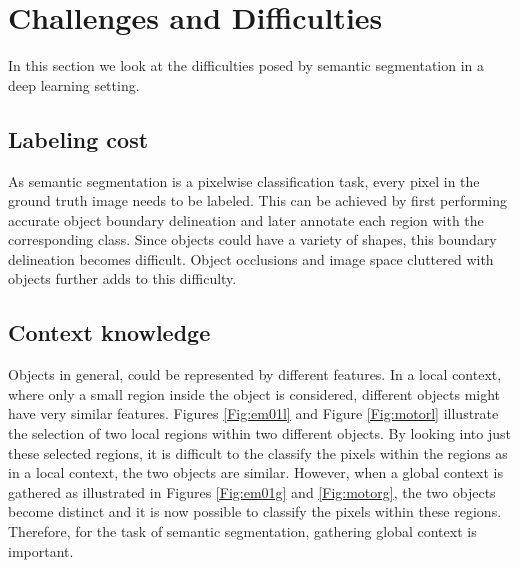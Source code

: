 \section{Challenges and Difficulties}

In this section we look at the difficulties posed by semantic segmentation in a deep learning setting.

\subsection{Labeling cost}

As semantic segmentation is a pixelwise classification task, every pixel in the ground truth image needs to be labeled. This can be achieved by first performing accurate object boundary delineation and later annotate each region with the corresponding class. Since objects could have a variety of shapes, this boundary delineation becomes difficult. Object occlusions and image space cluttered with objects further adds to this difficulty.

\subsection{Context knowledge}

Objects in general, could be represented by different features. In a local context, where only a small region inside the object is considered, different objects might have very similar features. Figures \ref{Fig:em01l} and Figure \ref{Fig:motorl} illustrate the selection of two local regions within two different objects. By looking into just these selected regions, it is difficult to the classify the pixels within the regions as in a local context, the two objects are similar. However, when a global context is gathered as illustrated in Figures \ref{Fig:em01g} and \ref{Fig:motorg}, the two objects become distinct and it is now possible to classify the pixels within these regions. Therefore, for the task of semantic segmentation, gathering global context is important. 

